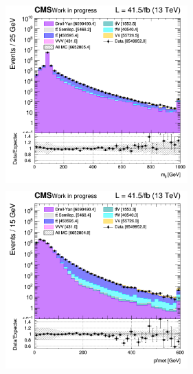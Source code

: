 \documentclass[a4paper, 10pt, openright]{report}
\begin{document}
\begin{figure}[htbp]
{\begin{minipage}[b]{.48\textwidth}
\includegraphics[width=7cm, height=7cm]{figs/2017/log_cratio_inclusiveCR_ll_mll.png}
\end{minipage}\hfill
\begin{minipage}[b]{.48\textwidth}
\includegraphics[width=7cm, height=7cm]{figs/2017/log_cratio_inclusiveCR_ll_METcorrected_pt.png}
\end{minipage} \hfill
}
\end{figure}
\end{document}

